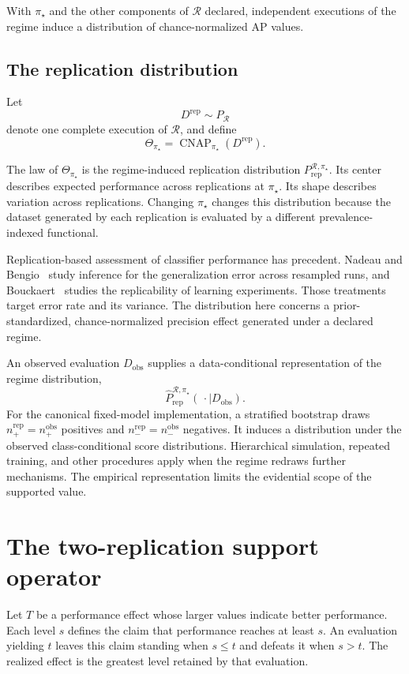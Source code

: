\documentclass[11pt]{article}
\newcommand{\CNAP}{\operatorname{CNAP}}
\newcommand{\Regime}{\mathcal{R}}
\newcommand{\Tpi}{\CNAP_{\pi_\star}}
\newcommand{\PRep}{P_{\mathrm{rep}}^{\Regime,\pi_\star}}
\newcommand{\PRepHat}{\widehat{P}_{\mathrm{rep}}^{\Regime,\pi_\star}}
\theoremstyle{remark}
\begin{document}
With $\pi_\star$ and the other components of $\Regime$ declared, independent executions of the regime induce a distribution of chance-normalized AP values.

\subsection{The replication distribution}

Let
\[
D^{\mathrm{rep}}\sim P_{\Regime}
\]
denote one complete execution of $\Regime$, and define
\begin{equation}
\Theta_{\pi_\star}
=
\Tpi(D^{\mathrm{rep}}).
\label{eq:Theta}
\end{equation}

The law of $\Theta_{\pi_\star}$ is the regime-induced replication distribution $\PRep$. Its center describes expected performance across replications at $\pi_\star$. Its shape describes variation across replications. Changing $\pi_\star$ changes this distribution because the dataset generated by each replication is evaluated by a different prevalence-indexed functional.

Replication-based assessment of classifier performance has precedent. Nadeau and Bengio~\cite{nadeau2003inference} study inference for the generalization error across resampled runs, and Bouckaert~\cite{bouckaert2004estimating} studies the replicability of learning experiments. Those treatments target error rate and its variance. The distribution here concerns a prior-standardized, chance-normalized precision effect generated under a declared regime.

An observed evaluation $D_{\mathrm{obs}}$ supplies a data-conditional representation of the regime distribution,
\[
\PRepHat(\,\cdot\mid D_{\mathrm{obs}}).
\]
For the canonical fixed-model implementation, a stratified bootstrap draws $n_+^{\mathrm{rep}}=n_+^{\mathrm{obs}}$ positives and $n_-^{\mathrm{rep}}=n_-^{\mathrm{obs}}$ negatives. It induces a distribution under the observed class-conditional score distributions. Hierarchical simulation, repeated training, and other procedures apply when the regime redraws further mechanisms. The empirical representation limits the evidential scope of the supported value.

\section{The two-replication support operator}
\label{sec:support}

Let $T$ be a performance effect whose larger values indicate better performance. Each level $s$ defines the claim that performance reaches at least $s$. An evaluation yielding $t$ leaves this claim standing when $s\leq t$ and defeats it when $s>t$. The realized effect is the greatest level retained by that evaluation.
\end{document}
